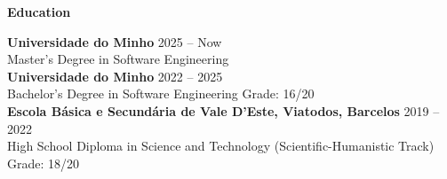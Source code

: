 \noindent\textbf{Education}
\noindent\hrulefill
\vspace{0.25em}
\begin{adjustwidth}{1.5em}{0em}
\textbf{Universidade do Minho} \hfill 2025 -- Now \\
Master's Degree in Software Engineering\vspace{0.5em}
\\
\textbf{Universidade do Minho} \hfill 2022 -- 2025 \\
Bachelor's Degree in Software Engineering \hfill Grade: 16/20\vspace{0.5em}
\\
\textbf{Escola Básica e Secundária de Vale D’Este, Viatodos, Barcelos} \hfill 2019 -- 2022 \\
High School Diploma in Science and Technology (Scientific-Humanistic Track) \hfill Grade: 18/20
\end{adjustwidth}
\vspace{0.25em}